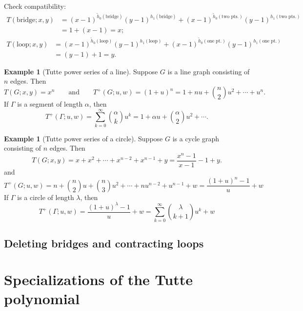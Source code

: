 \documentclass{amsart}
\theoremstyle{definition}
\newtheorem{eg}[thm]{Example}
\begin{document}
Check compatibility:
\begin{align*}
T(\text{bridge}; x,y) 
&= (x-1)^{\tilde h_0(\text{bridge}) }(y-1)^{h_1(\text{bridge} )} 
+ (x-1)^{\tilde h_0(\text{two pts.}) }(y-1)^{h_1(\text{two pts.})}  \\
&= 1 + (x-1) = x ;
\end{align*}
\begin{align*}
T(\text{loop}; x,y) 
&= (x-1)^{\tilde h_0(\text{loop}) }(y-1)^{h_1(\text{loop} )} 
+ (x-1)^{\tilde h_0(\text{one pt.}) }(y-1)^{h_1(\text{one pt.})} \\
&= (y-1) + 1 = y .
\end{align*}

\begin{eg}[Tutte power series of a line]
Suppose $G$ is a line graph consisting of $n$ edges.
Then
$$
T(G;x,y) = x^n 
\qquad\text{and}\qquad 
T^+(G;u,w) = (1+u)^n = 1 + nu + \binom{n}{2}u^2 + \cdots + u^n.
$$
If $\Gamma$ is a segment of length $\alpha$,
then
$$
T^+(\Gamma;u,w) = \sum_{k=0}^\infty \binom{\alpha}{k} u^k
= 1 + \alpha u + \binom{\alpha}{2}u^2 + \cdots .
$$
\end{eg}

\begin{eg}[Tutte power series of a circle]
Suppose $G$ is a cycle graph consisting of $n$ edges.
Then
$$
T(G;x,y) = x + x^2 + \cdots + x^{n-2} + x^{n-1} + y 
= \frac{x^n - 1}{x - 1} - 1 + y.
$$
and
$$
T^+(G;u,w) = n + \binom{n}{2}u + \binom{n}{3} u^2 + \cdots + nu^{n-2} + u^{n-1} + w
= \frac{(1+u)^n-1}{u} + w
$$
If $\Gamma$ is a circle of length $\lambda$, then 
$$
T^+(\Gamma;u,w) = \frac{(1 + u)^\lambda - 1}{u} + w
= \sum_{k=0}^\infty \binom{\lambda}{k+1} u^{k} + w
$$
\end{eg}

\subsection{Deleting bridges and contracting loops}


\section{Specializations of the Tutte polynomial}
\end{document}
